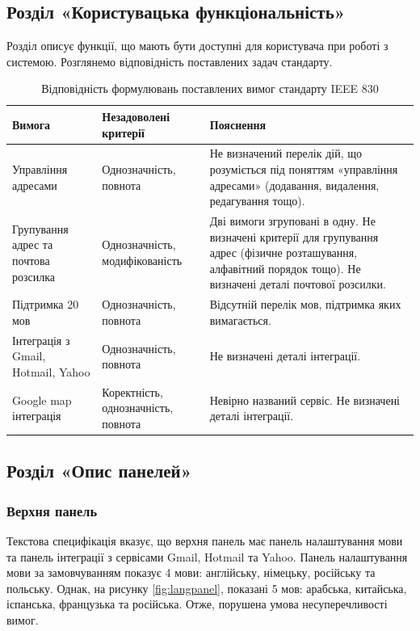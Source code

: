 \documentclass[a4paper,oneside,12pt,DIV=12,titlepage,toc]{scrartcl}
\begin{document}
		\subsection{Розділ «Користувацька функціональність»}
			Розділ описує функції, що мають бути доступні для користувача при роботі з системою. Розглянемо відповідність поставлених задач стандарту.
				
				\begin{longtable}{x{0.25\textwidth}x{0.2\textwidth}x{0.45\textwidth}}
					\toprule
					Вимога & Незадоволені критерії & Пояснення \\
					\midrule
					\endhead
					\bottomrule
					\caption{Відповідність формулювань поставлених вимог стандарту IEEE 830}\label{tab:sect01comp}
					\endfoot
					Управління адресами & Однозначність, повнота & Не визначений перелік дій, що розуміється під поняттям «управління адресами» (додавання, видалення, редагування тощо).\\
					Групування адрес та почтова розсилка & Однозначність, модифікованість & Дві вимоги згруповані в одну. Не визначені критерії для групування адрес (фізичне розташування, алфавітний порядок тощо). Не визначені деталі почтової розсилки.\\
					Підтримка 20 мов & Однозначність, повнота & Відсутній перелік мов, підтримка яких вимагається.\\
					Інтеграція з Gmail, Hotmail, Yahoo & Однозначність, повнота & Не визначені деталі інтеграції.\\
					Google map інтеграція & Коректність, однозначність, повнота & Невірно названий сервіс. Не визначені деталі інтеграції.\\
					
				\end{longtable}
		\subsection{Розділ «Опис панелей»}
			\subsubsection{Верхня панель}
				Текстова специфікація вказує, що верхня панель має панель налаштування мови та панель інтеграції з сервісами Gmail, Hotmail та Yahoo. Панель налаштування мови за замовчуванням показує 4 мови: англійську, німецьку, російську та польську. Однак, на рисунку \ref{fig:langpanel}, показані 5 мов: арабська, китайська, іспанська, французька та російська. Отже, порушена умова несуперечливості вимог. 
				
\end{document}
